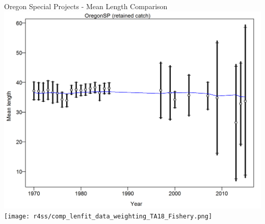 \documentclass[pdf]{beamer}\usepackage[]{graphicx}\usepackage[]{color}
\begin{document}
\begin{frame}{Oregon Special Projects - Mean Length Comparison}
  \includegraphics[scale = 0.37]{figures/OR_sp_meanlengths.png}
  \texttt{[image: r4ss/comp\_lenfit\_data\_weighting\_TA18\_Fishery.png]}
\end{frame}
\end{document}
